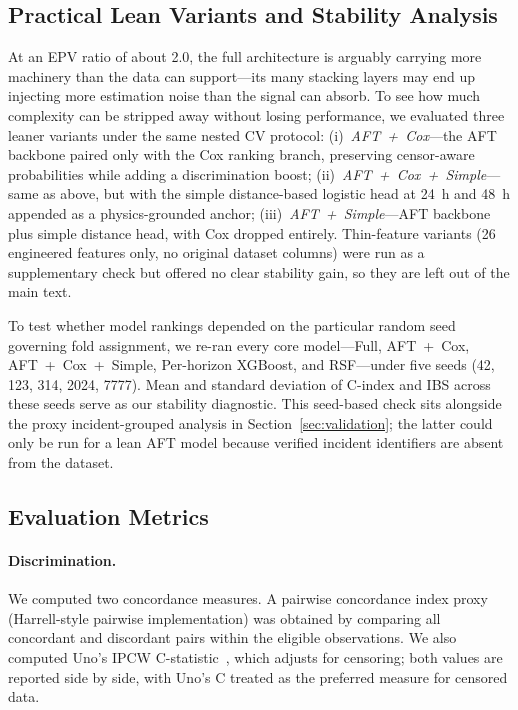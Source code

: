 \documentclass[fire,article,submit,pdftex]{../Definitions/mdpi}
\begin{document}
\subsection{Practical Lean Variants and Stability Analysis}\label{sec:lean_variants}

At an EPV ratio of about 2.0, the full architecture is arguably carrying more machinery than the data can support---its many stacking layers may end up injecting more estimation noise than the signal can absorb.
To see how much complexity can be stripped away without losing performance, we evaluated three leaner variants under the same nested CV protocol:
(i)~\emph{AFT~+~Cox}---the AFT backbone paired only with the Cox ranking branch, preserving censor-aware probabilities while adding a discrimination boost;
(ii)~\emph{AFT~+~Cox~+~Simple}---same as above, but with the simple distance-based logistic head at 24~h and 48~h appended as a physics-grounded anchor;
(iii)~\emph{AFT~+~Simple}---AFT backbone plus simple distance head, with Cox dropped entirely.
Thin-feature variants (26 engineered features only, no original dataset columns) were run as a supplementary check but offered no clear stability gain, so they are left out of the main text.

To test whether model rankings depended on the particular random seed governing fold assignment, we re-ran every core model---Full, AFT~+~Cox, AFT~+~Cox~+~Simple, Per-horizon XGBoost, and RSF---under five seeds (42, 123, 314, 2024, 7777).
Mean and standard deviation of C-index and IBS across these seeds serve as our stability diagnostic.
This seed-based check sits alongside the proxy incident-grouped analysis in Section~\ref{sec:validation}; the latter could only be run for a lean AFT model because verified incident identifiers are absent from the dataset.

\subsection{Evaluation Metrics}\label{sec:metrics}

\paragraph{Discrimination.}
We computed two concordance measures.
A pairwise concordance index proxy~\cite{Harrell1996} (Harrell-style pairwise implementation) was obtained by comparing all concordant and discordant pairs within the eligible observations.
We also computed Uno's IPCW C-statistic~\cite{Uno2011}, which adjusts for censoring; both values are reported side by side, with Uno's C treated as the preferred measure for censored data.
\end{document}
